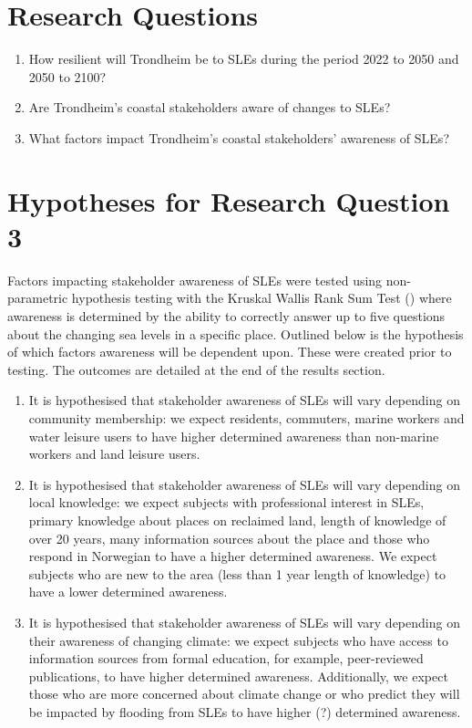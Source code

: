 \section{Research Questions}
\begin{enumerate}
    \item How resilient will Trondheim be to SLEs during the period 2022 to 2050 and 2050 to 2100?
    \item Are Trondheim's coastal stakeholders aware of changes to SLEs?
    \item What factors impact  Trondheim's coastal stakeholders’ awareness of SLEs?
\end{enumerate}



\section{Hypotheses for Research Question 3}
Factors  impacting stakeholder awareness of SLEs were tested using non-parametric hypothesis testing with the Kruskal Wallis Rank Sum Test (\cite{hollander_nonparametric_2014}) where awareness is determined by the ability to correctly answer up to five questions about the changing sea levels in a specific place. Outlined below is the hypothesis of which factors awareness will be dependent upon. These were created prior to testing. The outcomes are detailed at the end of the results section. 

\begin{enumerate}
    \item It is hypothesised that stakeholder awareness of SLEs will vary depending on community membership: we expect residents, commuters, marine workers and water leisure users to have higher determined awareness than non-marine workers and land leisure users.
  
    \item It is hypothesised that stakeholder awareness of SLEs will vary depending on local knowledge: we expect subjects with professional interest in SLEs,  primary knowledge about places on reclaimed land, length of knowledge of over 20 years, many information sources about the place and those who respond in Norwegian to have a higher determined awareness. We expect subjects who are new to the area (less than 1 year length of knowledge) to have a lower determined awareness.

    \item It is hypothesised that stakeholder awareness of SLEs will vary depending on their awareness of changing climate: we expect subjects who have access to information sources from formal education, for example, peer-reviewed publications, to have higher determined awareness. Additionally, we expect those who are more concerned about climate change or who predict they will be impacted by flooding from SLEs to have higher (?) determined awareness. 
\end{enumerate}

